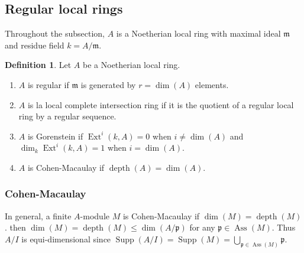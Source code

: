 \documentclass[leqno]{amsart}
\DeclareMathOperator{\Supp}{Supp}
\DeclareMathOperator{\Ass}{Ass}
\DeclareMathOperator{\depth}{depth}
\newcommand{\1}{\mathbf{1}}
\newcommand{\fm}{\mathfrak m}
\newcommand{\fp}{\mathfrak p}
\DeclareMathOperator{\Ext}{Ext}
\theoremstyle{definition}
\newtheorem{defn}[thm]{Definition}
\theoremstyle{remark}
\begin{document}
\subsection{Regular local rings}
Throughout the subsection, 
$A$ is a Noetherian local ring
with maximal ideal $\fm$ and residue field  $k=A/\fm$.
\begin{defn}
	Let $A$ be a Noetherian local ring.
	\begin{enumerate}[label=(\alph*)]
	\item 
	$A$ is regular if $\fm$ is generated by 
	$r=\dim(A)$ elements.
	\item 
	$A$ is la local complete intersection ring if
	it is the quotient of a regular local ring by 
	a regular sequence.
	\item 
	$A$ is Gorenstein if
	$\Ext^i(k,A)=0$ when $i\neq \dim(A)$ and
	$\dim_k\Ext^i(k,A)=1$  when $i=\dim(A)$.
	\item 
	$A$ is Cohen-Macaulay if  $\depth(A)=\dim(A)$.
	\end{enumerate}
\end{defn}

\subsubsection{Cohen-Macaulay}

In general, a finite $A$-module  $M$
is Cohen-Macaulay if  $\dim(M)=\depth(M)$.
then $\dim(M)=\depth(M)\leq \dim(A/\fp)$ 
for any $\fp\in \Ass(M)$.
Thus $A/I$ is equi-dimensional since
$\Supp(A/I)=\Supp(M)=\bigcup_{\fp\in\Ass(M)}\fp$.
\end{document}
